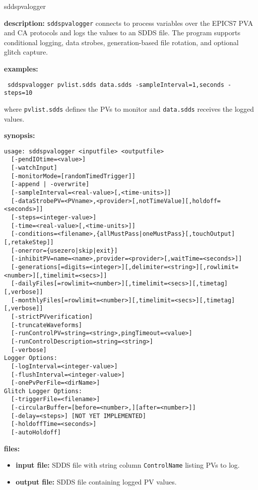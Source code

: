 \begin{sddsprog}{sddspvalogger}
\item \textbf{description:}
\verb+sddspvalogger+ connects to process variables over the EPICS7 PVA and CA protocols and logs the values to an SDDS file. The program supports conditional logging, data strobes, generation-based file rotation, and optional glitch capture.
\item \textbf{examples:}
\begin{flushleft}{\tt
sddspvalogger pvlist.sdds data.sdds -sampleInterval=1,seconds -steps=10\\
}\end{flushleft}
where {\tt pvlist.sdds} defines the PVs to monitor and {\tt data.sdds} receives the logged values.
\item \textbf{synopsis:}
\begin{verbatim}
usage: sddspvalogger <inputfile> <outputfile>
  [-pendIOtime=<value>]
  [-watchInput]
  [-monitorMode=[randomTimedTrigger]]
  [-append | -overwrite]
  [-sampleInterval=<real-value>[,<time-units>]]
  [-dataStrobePV=<PVname>,<provider>[,notTimeValue][,holdoff=<seconds>]]
  [-steps=<integer-value>]
  [-time=<real-value>[,<time-units>]]
  [-conditions=<filename>,{allMustPass|oneMustPass}[,touchOutput][,retakeStep]]
  [-onerror={usezero|skip|exit}]
  [-inhibitPV=name=<name>,provider=<provider>[,waitTime=<seconds>]]
  [-generations[=digits=<integer>][,delimiter=<string>][,rowlimit=<number>][,timelimit=<secs>]]
  [-dailyFiles[=rowlimit=<number>][,timelimit=<secs>][,timetag][,verbose]]
  [-monthlyFiles[=rowlimit=<number>][,timelimit=<secs>][,timetag][,verbose]]
  [-strictPVverification]
  [-truncateWaveforms]
  [-runControlPV=string=<string>,pingTimeout=<value>]
  [-runControlDescription=string=<string>]
  [-verbose]
Logger Options:
  [-logInterval=<integer-value>]
  [-flushInterval=<integer-value>]
  [-onePvPerFile=<dirName>]
Glitch Logger Options:
  [-triggerFile=<filename>]
  [-circularBuffer=[before=<number>,][after=<number>]]
  [-delay=<steps>] [NOT YET IMPLEMENTED]
  [-holdoffTime=<seconds>]
  [-autoHoldoff]
\end{verbatim}
\item \textbf{files:}
  \begin{itemize}
  \item \textbf{input file:} SDDS file with string column \verb|ControlName| listing PVs to log.
  \item \textbf{output file:} SDDS file containing logged PV values.
  \end{itemize}


\end{sddsprog}
